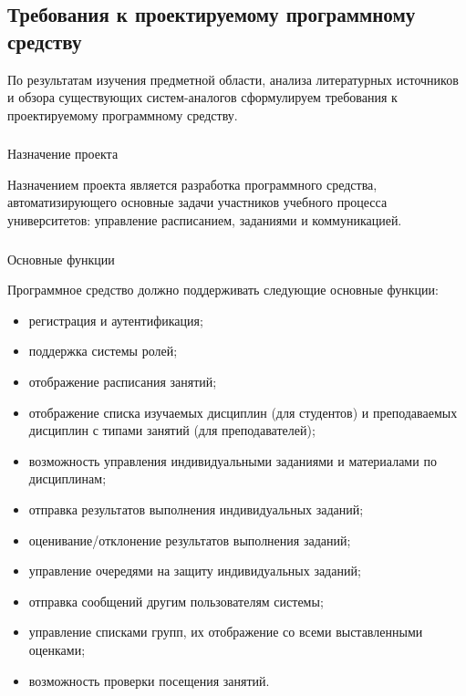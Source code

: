 \subsection{Требования к проектируемому программному средству}
\label{sec:analysis:specification}

По результатам изучения предметной области, анализа литературных источников и обзора существующих систем-аналогов сформулируем требования к проектируемому программному средству.

\subsubsection{} Назначение проекта
\label{sec:analysis:specification:purpose}

Назначением проекта является разработка программного средства, автоматизирующего основные задачи участников учебного процесса университетов: управление расписанием, заданиями и коммуникацией.

\subsubsection{} Основные функции
\label{sec:analysis:specification:functions}

Программное средство должно поддерживать следующие основные фун\-к\-ции:

\begin{itemize}
	\item регистрация и аутентификация;
	\item поддержка системы ролей;
	\item отображение расписания занятий;
	\item отображение списка изучаемых дисциплин (для студентов) и преподаваемых дисциплин с типами занятий (для преподавателей);
	\item возможность управления индивидуальными заданиями и материалами по дисциплинам;
	\item отправка результатов выполнения индивидуальных заданий;
	\item оценивание/отклонение результатов выполнения заданий;
	\item управление очередями на защиту индивидуальных заданий;
	\item отправка сообщений другим пользователям системы;
	\item управление списками групп, их отображение со всеми выставленными оценками;
	\item возможность проверки посещения занятий.
\end{itemize}


